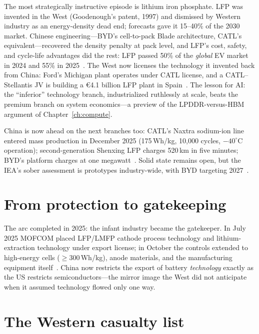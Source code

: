 The most strategically instructive episode is lithium iron phosphate. LFP was invented in the West (Goodenough's patent, 1997) and dismissed by Western industry as an energy-density dead end; forecasts gave it 15--40\% of the 2030 market. Chinese engineering---BYD's cell-to-pack Blade architecture, CATL's equivalent---recovered the density penalty at pack level, and LFP's cost, safety, and cycle-life advantages did the rest: LFP passed 50\% of the \emph{global} EV market in 2024 and 55\% in 2025~\cite{lfp-story,iea-gevo-2026}. The West now licenses the technology it invented back from China: Ford's Michigan plant operates under CATL license, and a CATL--Stellantis JV is building a €4.1 billion LFP plant in Spain~\cite{ford-catl}. The lesson for AI: the ``inferior'' technology branch, industrialized ruthlessly at scale, beats the premium branch on system economics---a preview of the LPDDR-versus-HBM argument of Chapter~\ref{ch:compute}.

China is now ahead on the next branches too: CATL's Naxtra sodium-ion line entered mass production in December 2025 (175\,Wh/kg, 10,000 cycles, $-40^{\circ}$C operation); second-generation Shenxing LFP charges 520\,km in five minutes; BYD's platform charges at one megawatt~\cite{naxtra,shenxing,byd-1mw}. Solid state remains open, but the IEA's sober assessment is prototypes industry-wide, with BYD targeting 2027~\cite{iea-gevo-2026}.

\section{From protection to gatekeeping}

The arc completed in 2025: the infant industry became the gatekeeper. In July 2025 MOFCOM placed LFP/LMFP cathode process technology and lithium-extraction technology under export license; in October the controls extended to high-energy cells ($\geq$300\,Wh/kg), anode materials, and the manufacturing equipment itself~\cite{mofcom-battery-controls}. China now restricts the export of battery \emph{technology} exactly as the US restricts semiconductors---the mirror image the West did not anticipate when it assumed technology flowed only one way.

\section{The Western casualty list}

